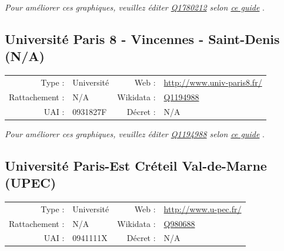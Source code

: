 \documentclass[12pt,french,landscape]{article}
\begin{document}
\textit{\scriptsize Pour améliorer ces graphiques, veuillez éditer \href{https://www.wikidata.org/entity/Q1780212}{Q1780212}  selon \href{https://github.com/cpesr/wikidataESR/blob/master/Rmd/wikidataESR.md}{ce guide}}
.


\newpage

\hypertarget{universituxe9-paris-8---vincennes---saint-denis-na}{%
\subsection{Université Paris 8 - Vincennes - Saint-Denis
(N/A)}\label{universituxe9-paris-8---vincennes---saint-denis-na}}

\begin{tabular*}{0.45\textwidth}{rp{2cm}rl}  
\hline  
Type : & Université & Web : &\href{http://www.univ-paris8.fr/}{http://www.univ-paris8.fr/} \\  
Rattachement : & N/A & Wikidata : & \href{https://www.wikidata.org/entity/Q1194988}{Q1194988} \\  
UAI : & 0931827F & Décret : & N/A \\  
\hline  
\end{tabular*}

\textit{\scriptsize Pour améliorer ces graphiques, veuillez éditer \href{https://www.wikidata.org/entity/Q1194988}{Q1194988}  selon \href{https://github.com/cpesr/wikidataESR/blob/master/Rmd/wikidataESR.md}{ce guide}}
.


\newpage

\hypertarget{universituxe9-paris-est-cruxe9teil-val-de-marne-upec}{%
\subsection{Université Paris-Est Créteil Val-de-Marne
(UPEC)}\label{universituxe9-paris-est-cruxe9teil-val-de-marne-upec}}

\begin{tabular*}{0.45\textwidth}{rp{2cm}rl}  
\hline  
Type : & Université & Web : &\href{http://www.u-pec.fr/}{http://www.u-pec.fr/} \\  
Rattachement : & N/A & Wikidata : & \href{https://www.wikidata.org/entity/Q980688}{Q980688} \\  
UAI : & 0941111X & Décret : & N/A \\  
\hline  
\end{tabular*}
\end{document}
